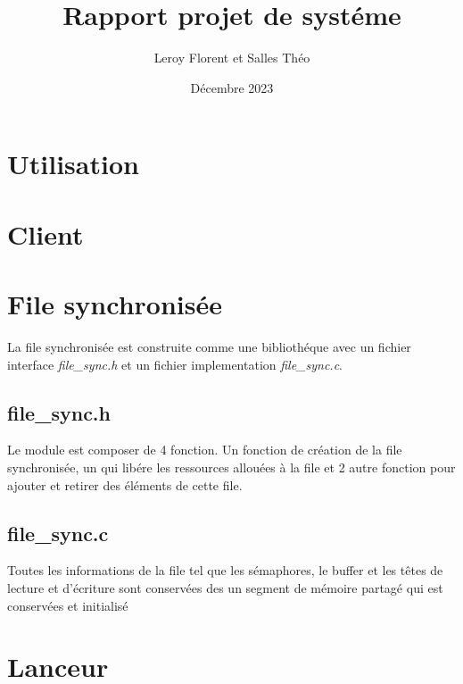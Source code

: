 \documentclass[12pt]{article}
\title{Rapport projet de systéme}
\author{Leroy Florent et Salles Théo}
\date{Décembre 2023}
\begin{document}
\maketitle
\tableofcontents
\newpage
\section{Utilisation}
\section{Client}
\section{File synchronisée}
La file synchronisée est construite comme une bibliothéque avec un fichier
interface \textit{file\_sync.h} et un fichier implementation
\textit{file\_sync.c}.
\subsection{file\_sync.h}
Le module est composer de 4 fonction. Un fonction de création de la file
synchronisée, un qui libére les ressources allouées à la file et 2 autre
fonction pour ajouter
et retirer des éléments de cette file.
\subsection{file\_sync.c}
Toutes les informations de la file tel que les sémaphores, le buffer et les têtes de lecture 
et d'écriture sont conservées des un segment de mémoire partagé qui est conservées et
initialisé

\section{Lanceur}
\end{document}

